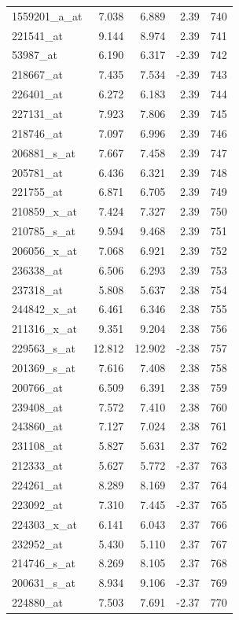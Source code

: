 \begin{footnotesize}
\begin{longtable}{lrrrr}
1559201\_a\_at & 7.038 & 6.889 & 2.39 & 740 \\
221541\_at & 9.144 & 8.974 & 2.39 & 741 \\
53987\_at & 6.190 & 6.317 & -2.39 & 742 \\
218667\_at & 7.435 & 7.534 & -2.39 & 743 \\
226401\_at & 6.272 & 6.183 & 2.39 & 744 \\
227131\_at & 7.923 & 7.806 & 2.39 & 745 \\
218746\_at & 7.097 & 6.996 & 2.39 & 746 \\
206881\_s\_at & 7.667 & 7.458 & 2.39 & 747 \\
205781\_at & 6.436 & 6.321 & 2.39 & 748 \\
221755\_at & 6.871 & 6.705 & 2.39 & 749 \\
210859\_x\_at & 7.424 & 7.327 & 2.39 & 750 \\
210785\_s\_at & 9.594 & 9.468 & 2.39 & 751 \\
206056\_x\_at & 7.068 & 6.921 & 2.39 & 752 \\
236338\_at & 6.506 & 6.293 & 2.39 & 753 \\
237318\_at & 5.808 & 5.637 & 2.38 & 754 \\
244842\_x\_at & 6.461 & 6.346 & 2.38 & 755 \\
211316\_x\_at & 9.351 & 9.204 & 2.38 & 756 \\
229563\_s\_at & 12.812 & 12.902 & -2.38 & 757 \\
201369\_s\_at & 7.616 & 7.408 & 2.38 & 758 \\
200766\_at & 6.509 & 6.391 & 2.38 & 759 \\
239408\_at & 7.572 & 7.410 & 2.38 & 760 \\
243860\_at & 7.127 & 7.024 & 2.38 & 761 \\
231108\_at & 5.827 & 5.631 & 2.37 & 762 \\
212333\_at & 5.627 & 5.772 & -2.37 & 763 \\
224261\_at & 8.289 & 8.169 & 2.37 & 764 \\
223092\_at & 7.310 & 7.445 & -2.37 & 765 \\
224303\_x\_at & 6.141 & 6.043 & 2.37 & 766 \\
232952\_at & 5.430 & 5.110 & 2.37 & 767 \\
214746\_s\_at & 8.269 & 8.105 & 2.37 & 768 \\
200631\_s\_at & 8.934 & 9.106 & -2.37 & 769 \\
224880\_at & 7.503 & 7.691 & -2.37 & 770 \\

\end{longtable}
\end{footnotesize}
